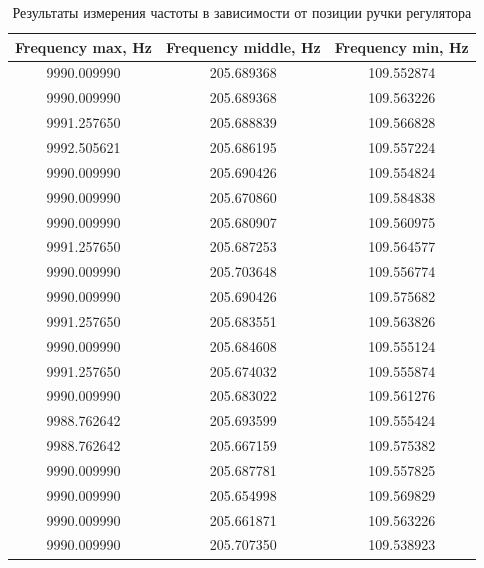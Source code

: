 \documentclass[a4paper,14pt]{article}
\begin{document}
\begin{longtable}[c]{|c|c|c|}
	\caption{Результаты измерения частоты в зависимости от позиции ручки регулятора}
	\label{tab:dfm_freq}\\
	\hline
	Frequency max, Hz & Frequency middle, Hz & Frequency min, Hz \\ \hline
	\endfirsthead
	\endhead
	9990.009990       & 205.689368           & 109.552874        \\ \hline
	9990.009990       & 205.689368           & 109.563226        \\ \hline
	9991.257650       & 205.688839           & 109.566828        \\ \hline
	9992.505621       & 205.686195           & 109.557224        \\ \hline
	9990.009990       & 205.690426           & 109.554824        \\ \hline
	9990.009990       & 205.670860           & 109.584838        \\ \hline
	9990.009990       & 205.680907           & 109.560975        \\ \hline
	9991.257650       & 205.687253           & 109.564577        \\ \hline
	9990.009990       & 205.703648           & 109.556774        \\ \hline
	9990.009990       & 205.690426           & 109.575682        \\ \hline
	9991.257650       & 205.683551           & 109.563826        \\ \hline
	9990.009990       & 205.684608           & 109.555124        \\ \hline
	9991.257650       & 205.674032           & 109.555874        \\ \hline
	9990.009990       & 205.683022           & 109.561276        \\ \hline
	9988.762642       & 205.693599           & 109.555424        \\ \hline
	9988.762642       & 205.667159           & 109.575382        \\ \hline
	9990.009990       & 205.687781           & 109.557825        \\ \hline
	9990.009990       & 205.654998           & 109.569829        \\ \hline
	9990.009990       & 205.661871           & 109.563226        \\ \hline
	9990.009990       & 205.707350           & 109.538923        \\ \hline

\end{longtable}
\end{document}
